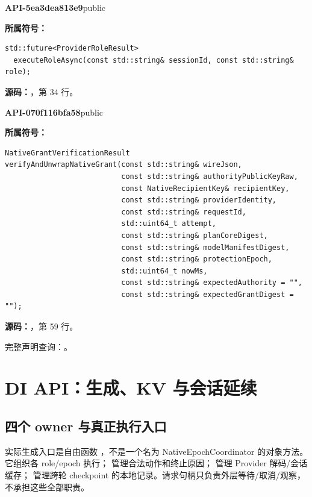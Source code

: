\textbf{API-5ea3dea813e9}\quad public\par
\textbf{所属符号：}\par
\begin{Verbatim}[fontsize=\footnotesize,breaklines,breakanywhere]
std::future<ProviderRoleResult>
  executeRoleAsync(const std::string& sessionId, const std::string& role);
\end{Verbatim}
\textbf{源码：}，第 34 行。\par

\textbf{API-070f116bfa58}\quad public\par
\textbf{所属符号：}\par
\begin{Verbatim}[fontsize=\footnotesize,breaklines,breakanywhere]
NativeGrantVerificationResult
verifyAndUnwrapNativeGrant(const std::string& wireJson,
                           const std::string& authorityPublicKeyRaw,
                           const NativeRecipientKey& recipientKey,
                           const std::string& providerIdentity,
                           const std::string& requestId,
                           std::uint64_t attempt,
                           const std::string& planCoreDigest,
                           const std::string& modelManifestDigest,
                           const std::string& protectionEpoch,
                           std::uint64_t nowMs,
                           const std::string& expectedAuthority = "",
                           const std::string& expectedGrantDigest = "");
\end{Verbatim}
\textbf{源码：}，第 59 行。\par

完整声明查询：。

\section{DI API：生成、KV 与会话延续}

\subsection{四个 owner 与真正执行入口}
实际生成入口是自由函数 ，不是一个名为 NativeEpochCoordinator 的对象方法。它组织各 role/epoch 执行； 管理合法动作和终止原因； 管理 Provider 解码/会话缓存； 管理跨轮 checkpoint 的本地记录。请求句柄只负责外层等待/取消/观察，不承担这些全部职责。

